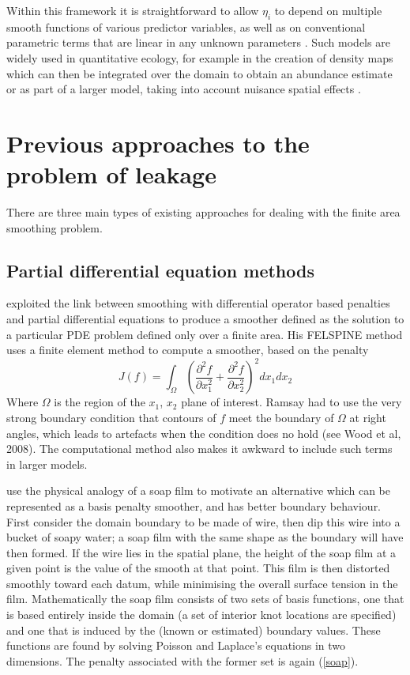 \documentclass[smallextended]{svjour3}       %
\newcommand{\beq}{\begin{equation}}
\newcommand{\eeq}{\end{equation}}
\newcommand{\pdif}[2]{\frac{\partial #1}{\partial #2}}
\begin{document}
Within this framework it is straightforward to allow $\eta_i$ to depend on multiple smooth functions of various predictor variables, as well as on conventional parametric terms that are linear in any unknown parameters \citep{hastie1990generalized}. Such models are widely used in quantitative ecology, for example in the creation of density maps which can then be integrated over the domain to obtain an abundance estimate \citep[e.g.]{WILLIAMS:2011in,Miller:2013us} or as part of a larger model, taking into account nuisance spatial effects \citep[e.g.]{Augustin:2009ui}.

\section{Previous approaches to the problem of leakage}
\label{previous-approaches}

There are three main types of existing approaches for dealing with the finite area smoothing problem.

\subsection{Partial differential equation methods}

\cite{Ramsay:2002uo} exploited the link between smoothing with differential operator based penalties and partial differential equations to produce a smoother defined as the solution to a particular PDE problem defined only over a finite area. His FELSPINE method uses a finite element method to compute a smoother, based on the penalty 
\beq
J(f) = \int_\Omega \left ( \pdif{^2 f}{x_1^2} + \pdif{^2 f}{x_2^2} \right )^2 dx_1 dx_2 
\label{soap}
\eeq 
Where $\Omega$ is the region of the $x_1$, $x_2$ plane of interest. Ramsay had to use the very strong boundary condition that contours of $f$ meet the boundary of $\Omega$ at right angles, which leads to artefacts when the condition does no hold (see Wood et al, 2008). The computational method also makes it awkward to include such terms in larger models.

\cite{Wood:2008vo} use the physical analogy of a soap film to motivate an alternative which can be represented as a basis penalty smoother, and has better boundary behaviour. First consider the domain boundary to be made of wire, then dip this wire into a bucket of soapy water; a soap film with the same shape as the boundary will have then formed. If the wire lies in the spatial plane, the height of the soap film at a given point is the value of the smooth at that point. This film is then distorted smoothly toward each datum, while minimising the overall surface tension in the film. Mathematically the soap film consists of two sets of basis functions, one that is based entirely inside the domain (a set of interior knot locations are specified) and one that is induced by the (known or estimated) boundary values. These functions are found by solving Poisson and Laplace's equations in two dimensions. The penalty associated with the former set is again (\ref{soap}). 
\end{document}
